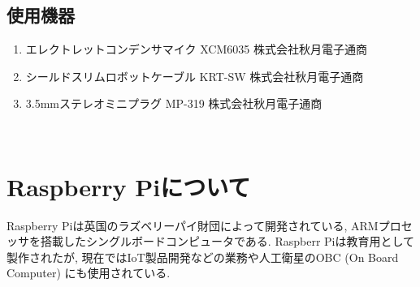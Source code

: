 \subsection{使用機器}\label{used-equipments-mic}
  \begin{enumerate}
  \renewcommand{\labelenumi}{(\arabic{enumi})}
  \item
    エレクトレットコンデンサマイク XCM6035 株式会社秋月電子通商
  \item
    シールドスリムロボットケーブル KRT-SW 株式会社秋月電子通商
  \item
    3.5mmステレオミニプラグ MP-319 株式会社秋月電子通商
  \end{enumerate}

\newpage

\
\section{Raspberry Piについて}\label{about-raspberry}

Raspberry Piは英国のラズベリーパイ財団によって開発されている, ARMプロセッサを搭載したシングルボードコンピュータである. Raspberr
Piは教育用として製作されたが, 現在ではIoT製品開発などの業務や人工衛星のOBC (On Board Computer) にも使用されている. 

